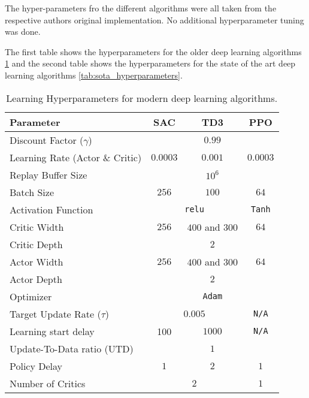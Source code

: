 The hyper-parameters fro the different algorithms were all taken from the respective authors original implementation. No additional hyperparameter tuning was done.

The first table shows the hyperparameters for the older deep learning algorithms \ref{tab:old_hyperparameters} and the second table shows the hyperparameters for the state of the art deep learning algorithms \ref{tab:sota_hyperparameters}.


\begin{table}[H]
\centering
\caption{Learning Hyperparameters for modern deep learning algorithms.}
\label{tab:old_hyperparameters}
\begin{tabular}{l|c|c|c}
\toprule
\textbf{Parameter}                &  SAC  & TD3  & PPO \\
\midrule\midrule
Discount Factor ($\gamma$)        & \multicolumn{3}{c}{$0.99$}             \\ \midrule
Learning Rate (Actor \& Critic)   & $0.0003$ & $0.001$ & $0.0003$\\ \midrule
Replay Buffer Size                & \multicolumn{3}{c}{$10^6$}             \\\midrule
Batch Size                        & $256$ & $100$ & $64$      \\\midrule
Activation Function               & \multicolumn{2}{c|}{\texttt{relu}}  & \texttt{Tanh}   \\\midrule
Critic Width                      & $256$ & $400$ and $300$ & $64$      \\\midrule
Critic Depth                      & \multicolumn{3}{c}{$2$}      \\\midrule
Actor Width                       & $256$ & $400$ and $300$ & $64$   \\\midrule
Actor Depth                       & \multicolumn{3}{c}{$2$}    \\\midrule
Optimizer                         & \multicolumn{3}{c}{\texttt{Adam}}     \\\midrule
Target Update Rate ($\tau$)       & \multicolumn{2}{c|}{$0.005$} & \texttt{N/A}       \\\midrule
Learning start delay              & 100 & $1000$ & \texttt{N/A}  \\\midrule
Update-To-Data ratio (UTD)        & \multicolumn{3}{c}{$1$}      \\ \midrule
Policy Delay                      & $1$  & $2$ & $1$      \\\midrule
Number of  Critics                & \multicolumn{2}{c|}{$2$}  & $1$  \\\midrule

\end{tabular}
\end{table}
